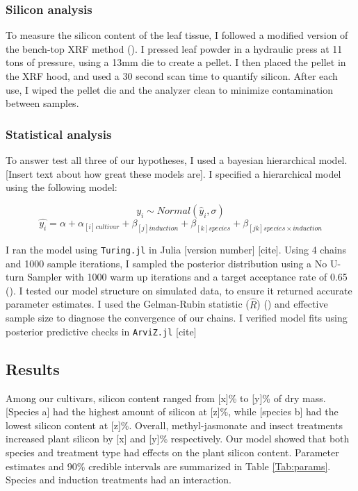 \documentclass[12pt, letterpaper, ]{article}
\begin{document}
\subsubsection{Silicon analysis}

To measure the silicon content of the leaf tissue, I followed a modified version of the bench-top XRF method (\cite{reidinger_rapid_2012}). I pressed leaf powder in a hydraulic press at 11 tons of pressure, using a 13mm die to create a pellet. I then placed the pellet in the XRF hood, and used a 30 second scan time to quantify silicon. After each use, I wiped the pellet die and the analyzer clean to minimize contamination between samples.

\subsubsection{Statistical analysis}

To answer test all three of our hypotheses, I used a bayesian hierarchical model. [Insert text about how great these models are]. I specified a hierarchical model using the following model:

\[y_i \sim Normal(\hat{y}_i, \sigma)\]
\[\hat{y_i} = \alpha + \alpha_{[i]cultivar} + \beta_{[j]induction} + \beta_{[k]species} + \beta_{[jk]species \times induction}\]

I ran the model using \verb|Turing.jl| in Julia [version number] [cite]. Using 4 chains and 1000 sample iterations, I sampled the posterior distribution using a No U-turn Sampler with 1000 warm up iterations and a target acceptance rate of 0.65 (\cite{hoffman_no-u-turn_2014}). I tested our model structure on simulated data, to ensure it returned accurate parameter estimates. I used the Gelman-Rubin statistic (\( \hat{R} \)) (\cite{gelman_inference_1992}) and effective sample size to diagnose the convergence of our chains. I verified model fits using posterior predictive checks in \verb|ArviZ.jl| [cite] 

\subsection{Results}

Among our cultivars, silicon content ranged from [x]\% to [y]\% of dry mass. [Species a] had the highest amount of silicon at [z]\%, while [species b] had the lowest silicon content at [z]\%. Overall, methyl-jasmonate and insect treatments increased plant silicon by [x] and [y]\% respectively. Our model showed that both species and treatment type had effects on the plant silicon content. Parameter estimates and 90\% credible intervals are summarized in Table \ref{Tab:params}. Species and induction treatments had an interaction. 
\end{document}
